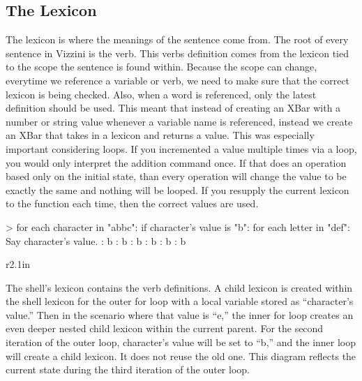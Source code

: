 \documentclass[titlepage]{article}
\newcommand{\langName}{Vizzini}
\begin{document}
\subsection*{The Lexicon}
The lexicon is where the meanings of the sentence come from. The root of every sentence in \langName{} is the verb. This verbs definition comes from the lexicon tied to the scope the sentence is found within. Because the scope can change, everytime we reference a variable or verb, we need to make sure that the correct lexicon is being checked. Also, when a word is referenced, only the latest definition should be used. This meant that instead of creating an XBar with a number or string value whenever a variable name is referenced, instead we create an XBar that takes in a lexicon and returns a value. This was especially important considering loops. If you incremented  a value multiple times via a loop, you would only interpret the addition command once. If that does an operation based only on the initial state, than every operation will change the value to be exactly the same and nothing will be looped. If you resupply the current lexicon to the function each time, then the correct values are used.

\begin{codeblock}[caption={Scope Demonstration},label={lst:scopeDemo}]
> for each character in "abbc": if character's value is "b": for each letter in "def": Say character's value.
: b
: b
: b
: b
: b
: b
\end{codeblock}

\begin{wrapfigure}[7]{r}{2.1in}
	\hspace{1em}
\end{wrapfigure}

The shell's lexicon contains the verb definitions. A child lexicon is created within the shell lexicon for the outer for loop with a local variable stored as ``character's value.'' Then in the scenario where that value is ``e,'' the inner for loop creates an even deeper nested child lexicon within the current parent. For the second iteration of the outer loop, character's value will be set to ``b,'' and the inner loop will create a child lexicon. It does not reuse the old one. This diagram reflects the current state during the third iteration of the outer loop.
\end{document}
